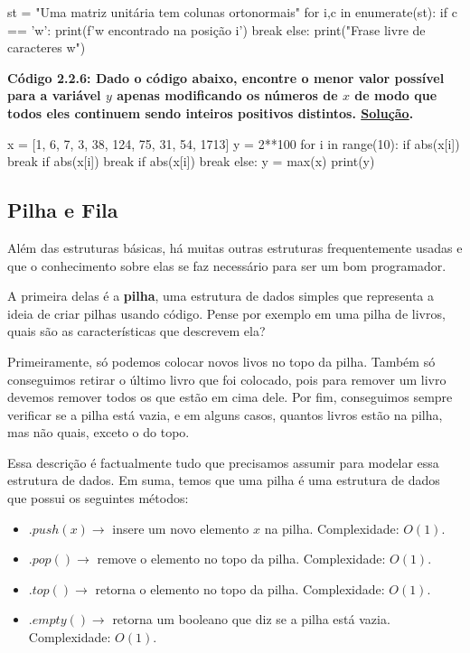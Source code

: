 \documentclass[11pt, a4paper]{article}
\begin{document}
\begin{code}
st = "Uma matriz unitária tem colunas ortonormais"
for i,c in enumerate(st):
    if c == 'w':
        print(f'w encontrado na posição {i}')
        break
else:
    print("Frase livre de caracteres w")
\end{code}

\textbf{Código 2.2.6: Dado o código abaixo, encontre o menor valor possível para a variável \(y\) apenas modificando os números de \(x\) de modo que todos eles continuem sendo inteiros positivos distintos. \hyperref[sol_c2.2.6]{Solução}.}

\label{c2.2.6}

\begin{code}
x = [1, 6, 7, 3, 38, 124, 75, 31, 54, 1713]
y = 2**100
for i in range(10):
	if abs(x[i])%
		break
	if abs(x[i])%
		break
	if abs(x[i])%
		break
else:
    y = max(x)
print(y)
\end{code}

\subsection{Pilha e Fila}

Além das estruturas básicas, há muitas outras estruturas frequentemente usadas e que o conhecimento sobre elas se faz necessário para ser um bom programador.

A primeira delas é a \textbf{pilha}, uma estrutura de dados simples que representa a ideia de criar pilhas usando código. Pense por exemplo em uma pilha de livros, quais são as características que descrevem ela? 

Primeiramente, só podemos colocar novos livos no topo da pilha. Também só conseguimos retirar o último livro que foi colocado, pois para remover um livro devemos remover todos os que estão em cima dele. Por fim, conseguimos sempre verificar se a pilha está vazia, e em alguns casos, quantos livros estão na pilha, mas não quais, exceto o do topo.

Essa descrição é factualmente tudo que precisamos assumir para modelar essa estrutura de dados. Em suma, temos que uma pilha é uma estrutura de dados que possui os seguintes métodos:

\begin{itemize}
    \item \(.push(x) \rightarrow\) insere um novo elemento \(x\) na pilha. Complexidade: \(O(1)\).

    \item \(.pop() \rightarrow\) remove o elemento no topo da pilha. Complexidade: \(O(1)\).

    \item \(.top() \rightarrow\) retorna o elemento no topo da pilha. Complexidade: \(O(1)\).

    \item \(.empty() \rightarrow\) retorna um booleano que diz se a pilha está vazia. Complexidade: \(O(1)\).
    
\end{itemize}
\end{document}
